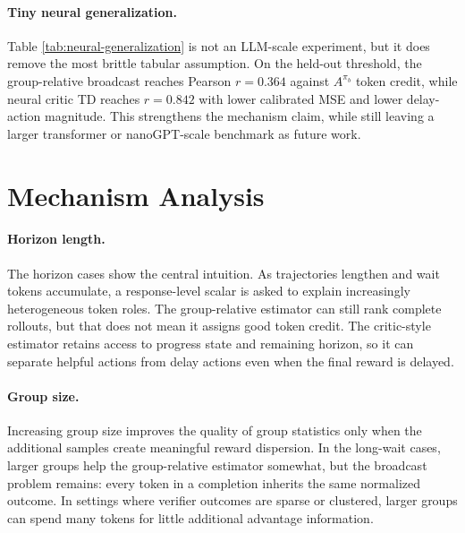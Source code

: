 \documentclass[11pt]{article}
\begin{document}
\begin{table}[!htbp]
\centering
\caption{Tiny neural value-critic generalization audit. The value critic is
trained on thresholds 1 and 3, then evaluated on held-out threshold 2. Exact
tabular state lookup cannot match the evaluation threshold, so the TD signal
comes from feature interpolation.}
\label{tab:neural-generalization}
\scriptsize

\end{table}

\paragraph{Tiny neural generalization.}
Table \ref{tab:neural-generalization} is not an LLM-scale experiment, but it
does remove the most brittle tabular assumption. On the held-out threshold, the
group-relative broadcast reaches Pearson $r=0.364$ against $A^{\pi_b}$ token
credit, while neural critic TD reaches $r=0.842$ with lower calibrated MSE and
lower delay-action magnitude. This strengthens the mechanism claim, while still
leaving a larger transformer or nanoGPT-scale benchmark as future work.

\FloatBarrier

\section{Mechanism Analysis}

\paragraph{Horizon length.}
The horizon cases show the central intuition. As trajectories lengthen and wait
tokens accumulate, a response-level scalar is asked to explain increasingly
heterogeneous token roles. The group-relative estimator can still rank complete
rollouts, but that does not mean it assigns good token credit. The critic-style
estimator retains access to progress state and remaining horizon, so it can
separate helpful actions from delay actions even when the final reward is
delayed.

\paragraph{Group size.}
Increasing group size improves the quality of group statistics only when the
additional samples create meaningful reward dispersion. In the long-wait cases,
larger groups help the group-relative estimator somewhat, but the broadcast
problem remains: every token in a completion inherits the same normalized
outcome. In settings where verifier outcomes are sparse or clustered, larger
groups can spend many tokens for little additional advantage information.
\end{document}
